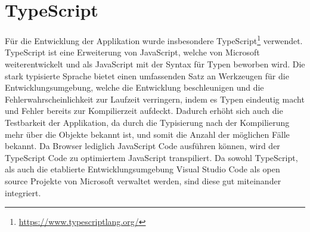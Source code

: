 \section{TypeScript}
Für die Entwicklung der Applikation wurde insbesondere TypeScript\footnote{\url{https://www.typescriptlang.org/}} verwendet. TypeScript ist eine Erweiterung von JavaScript, welche von Microsoft weiterentwickelt und als JavaScript mit der Syntax für Typen beworben wird. Die stark typisierte Sprache bietet einen umfassenden Satz an Werkzeugen für die Entwicklungsumgebung, welche die Entwicklung beschleunigen und die Fehlerwahrscheinlichkeit zur Laufzeit verringern, indem es Typen eindeutig macht und Fehler bereits zur Kompilierzeit aufdeckt. Dadurch erhöht sich auch die Testbarkeit der Applikation, da durch die Typisierung nach der Kompilierung mehr über die Objekte bekannt ist, und somit die Anzahl der möglichen Fälle bekannt. Da Browser lediglich JavaScript Code ausführen können, wird der TypeScript Code zu optimiertem JavaScript transpiliert. Da sowohl TypeScript, als auch die etablierte Entwicklungsumgebung Visual Studio Code als open source Projekte von Microsoft verwaltet werden, sind diese gut miteinander integriert.
